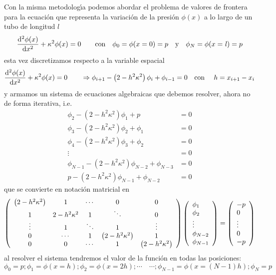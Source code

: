 \documentclass[spanish,titlepage,11pt]{article}
\begin{document}
Con la misma metodolog\'{\i}a podemos abordar el problema de valores de
frontera para la ecuaci\'{o}n que representa la variaci\'{o}n de la
presi\'{o}n $\phi(x)$ a lo largo de un tubo de longitud $\mathit{l}$%
\[
\frac{\mathrm{d}^{2}\phi(x)}{\mathrm{d}x^{2}}+\kappa^{2}\phi(x)=0\qquad
\text{con\quad}\phi_{0}=\phi(x=0)=p\quad\text{y\quad}\phi_{N}=\phi
(x=\mathit{l})=p
\]
esta vez discretizamos respecto a la variable espacial
\[
\frac{\mathrm{d}^{2}\phi(x)}{\mathrm{d}x^{2}}+\kappa^{2}\phi(x)=0\qquad
\Rightarrow\phi_{i+1}-\left(  2-h^{2}\kappa^{2}\right)  \phi_{i}+\phi
_{i-1}=0\quad\text{con\ \quad}h=x_{i+1}-x_{i}
\]
y armamos un sistema de ecuaciones algebraicas que debemos resolver, ahora no
de forma iterativa, i.e.
\begin{align*}
\phi_{2}-\left(  2-h^{2}\kappa^{2}\right)  \phi_{1}+p  &  =0\\
\phi_{3}-\left(  2-h^{2}\kappa^{2}\right)  \phi_{2}+\phi_{1}  &  =0\\
\phi_{4}-\left(  2-h^{2}\kappa^{2}\right)  \phi_{3}+\phi_{2}  &  =0\\
\vdots &  =0\\
\phi_{N-1}-\left(  2-h^{2}\kappa^{2}\right)  \phi_{N-2}+\phi_{N-3}  &  =0\\
p-\left(  2-h^{2}\kappa^{2}\right)  \phi_{N-1}+\phi_{N-2}  &  =0
\end{align*}
que se convierte en notaci\'{o}n matricial en
\[
\left(
\begin{array}
[c]{ccccc}%
\left(  2-h^{2}\kappa^{2}\right)  & 1 & \cdots & 0 & 0\\
1 & 2-h^{2}\kappa^{2} & 1 & \ddots & 0\\
\vdots & 1 & \ddots & 1 & \vdots\\
0 & \cdots & 1 & \left(  2-h^{2}\kappa^{2}\right)  & 1\\
0 & 0 & \cdots & 1 & \left(  2-h^{2}\kappa^{2}\right)
\end{array}
\right)  \left(
\begin{array}
[c]{l}%
\phi_{1}\\
\phi_{2}\\
\vdots\\
\phi_{N-2}\\
\phi_{N-1}%
\end{array}
\right)  =\left(
\begin{array}
[c]{l}%
-p\\
0\\
\vdots\\
0\\
-p
\end{array}
\right)
\]
al resolver el sistema tendremos el valor de la funci\'{o}n en todas las
posiciones:
\[
\phi_{0}=p;\phi_{1}=\phi(x=h);\phi_{2}=\phi(x=2h);\cdots\quad\cdots;\phi
_{N-1}=\phi(x=\left(  N-1\right)  h);\phi_{N}=p
\]
\end{document}
